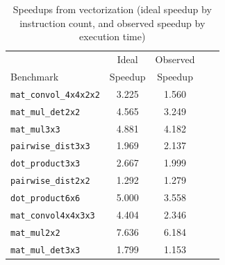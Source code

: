 \begin{table}
    \begin{tabular}{lcccc}
        \toprule    
         & Ideal & Observed\\
        Benchmark & Speedup & Speedup\\\midrule
        \texttt{mat\_convol\_4x4x2x2} & 3.225 & 1.560\\
        \texttt{mat\_mul\_det2x2} & 4.565 & 3.249\\
        \texttt{mat\_mul3x3} & 4.881 & 4.182\\
        \texttt{pairwise\_dist3x3} & 1.969 & 2.137\\
        \texttt{dot\_product3x3} & 2.667 & 1.999\\
        \texttt{pairwise\_dist2x2} & 1.292 & 1.279\\
        \texttt{dot\_product6x6} & 5.000 & 3.558\\
        \texttt{mat\_convol4x4x3x3} & 4.404 & 2.346\\
        \texttt{mat\_mul2x2} & 7.636 & 6.184\\
        \texttt{mat\_mul\_det3x3} & 1.799 & 1.153\\\bottomrule
    \end{tabular}
    \caption{Speedups from vectorization (ideal speedup by instruction count, and observed speedup by execution time)}\label{tab:ideal-speedup}
\end{table}


